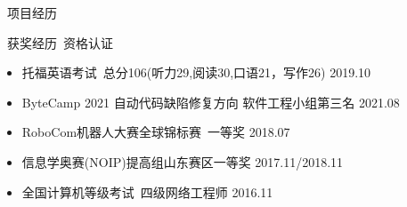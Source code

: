 \documentclass[UTF8]{resume}
\begin{document}
\begin{rSection}{\faUsers~项目经历}


\end{rSection}

\begin{rSection}{\faAward~获奖经历~资格认证}
    \begin{itemize}
        \itemsep -0.5em
        \item 托福英语考试~总分106(听力29,阅读30,口语21，写作26) \hfill 2019.10
        \item ByteCamp 2021 自动代码缺陷修复方向 软件工程小组第三名 \hfill 2021.08
        \item RoboCom机器人大赛全球锦标赛~一等奖 \hfill 2018.07
        \item 信息学奥赛(NOIP)提高组山东赛区一等奖 \hfill 2017.11/2018.11
        \item 全国计算机等级考试~四级网络工程师 \hfill 2016.11
    \end{itemize}
\end{rSection}
\end{document}
